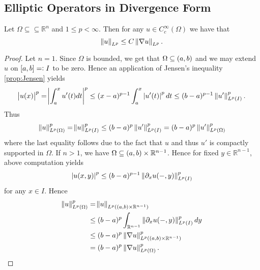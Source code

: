 \subsection*{Elliptic Operators in Divergence Form}

\begin{lemma}
	\label{lem:PI}
	Let $\Omega \subseteq\subseteq \mathbb{R}^n$ and $1 \leq p < \infty$. Then for any $u \in C^\infty_c(\Omega)$ we have that
	\begin{equation*}
		\norm{u}_{L^p} \leq C\norm[0]{\nabla u}_{L^p}.
	\end{equation*}
\end{lemma}

\begin{proof}
	Let $n = 1$. Since $\Omega$ is bounded, we get that $\Omega \subseteq \intoo{a,b}$ and we may extend $u$ on $\intcc{a,b} =: I$ to be zero. Hence an application of Jensen's inequality \ref{prop:Jensen} yields
	\begin{equation*}
		\abs{u(x)}^p = \abs[3]{\int_a^x u'(t)dt}^p \leq (x - a)^{p - 1} \int_a^x \abs[0]{u'(t)}^pdt \leq (b - a)^{p-1} \norm[0]{u'}_{L^p(I)}^p.
	\end{equation*}
	Thus
	\begin{equation*}
		\norm[0]{u}_{L^p(\Omega)}^p = \norm{u}_{L^p(I)}^p \leq (b - a)^p \norm[0]{u'}^p_{L^p(I)} = (b - a)^p \norm[0]{u'}_{L^p(\Omega)}^p
	\end{equation*}
	\noindent where the last equality follows due to the fact that $u$ and thus $u'$ is compactly supported in $\Omega$. If $n > 1$, we have $\Omega \subseteq \intoo{a,b} \times \mathbb{R}^{n-1}$. Hence for fixed $y \in \mathbb{R}^{n - 1}$, above computation yields
	\begin{equation*}
		\abs[0]{u(x,y)}^p \leq (b - a)^{p - 1}\norm[0]{\partial_xu(-,y)}^p_{L^p(I)}
	\end{equation*}
	\noindent for any $x \in I$. Hence
	\begin{align*}
		\norm{u}_{L^p(\Omega)}^p &= \norm{u}_{L^p(\intoo{a,b} \times \mathbb{R}^{n - 1})}\\
		&\leq (b - a)^p \int_{\mathbb{R}^{n - 1}} \norm[0]{\partial_xu(-,y)}^p_{L^p(I)}dy\\
		&\leq (b - a)^p \norm[0]{\nabla u}^p_{L^p(\intoo{a,b} \times \mathbb{R}^{n - 1})}\\
		&= (b - a)^p \norm[0]{\nabla u}_{L^p(\Omega)}^p.
	\end{align*}
\end{proof}


